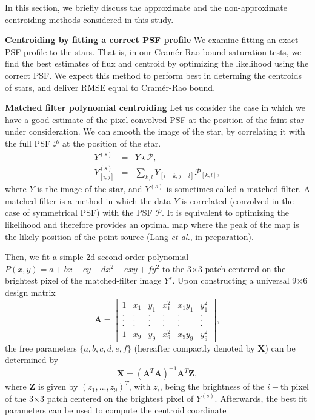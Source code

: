 \documentclass[12pt, preprint]{aastex}
\newcommand{\beq}{\begin{equation}}
\newcommand{\eeq}{\end{equation}}
\begin{document}
In this section, we briefly discuss the approximate and the non-approximate centroiding methods considered in this 
study. 

\begin{description}

\item{{\bf Centroiding by fitting a correct PSF profile}} \quad We examine fitting an exact PSF 
profile to the stars. That is, 
in our Cram\'{e}r-Rao bound saturation tests, we find the best
estimates of flux and centroid by optimizing the likelihood using 
the correct PSF. We expect this method to perform best in determing the centroids
of stars, and deliver RMSE equal to Cram\'{e}r-Rao bound.

\item{{\bf Matched filter polynomial centroiding}} \quad Let us consider the case 
in which we have a good estimate of the pixel-convolved PSF at
the position of the faint star under consideration. 
We can smooth the image of the star, by correlating it with the 
full PSF $\mathcal{P}$ at the position of the star.
\begin{eqnarray}
Y^{(s)} &=& Y \star \mathcal{P}, \\
Y^{(s)}_{[i,j]} &=& \sum_{k,l}Y_{[i-k,j-l]}\mathcal{P}_{[k,l]},
\end{eqnarray}
where $Y$ is the image of the star, and $Y^{(s)}$ is sometimes called a matched filter. 
A matched filter is a method in which the data $Y$ is correlated (convolved in the 
case of symmetrical PSF) with the PSF $\mathcal{P}$. It is equivalent to optimizing the 
likelihood and therefore provides an optimal map 
where the peak of the map is the likely position of the 
point source (Lang \emph{et al.}, in preparation).

Then, we fit a simple 2d second-order polynomial 
$P(x,y)=a+bx+cy+dx^2+exy+fy^2$ 
to the 3$\times$3 patch centered on the brightest pixel of the
matched-filter image $Y^{s}$.
Upon constructing a universal 9$\times$6 design matrix
\begin{equation}
    \mathbf{A} = 
    \begin{bmatrix}
        1 & x_{1} & y_{1} & x_{1}^{2} & x_{1}y_{1} & y_{1}^{2} \\
        . & . & . & . & . & .  \\
        . & . & . & . & . & .  \\
        . & . & . & . & . & .  \\
        1 & x_{9} & y_{9} & x_{9}^{2} & x_{9}y_{9} & y_{9}^{2}
    \end{bmatrix},
\end{equation}
the free parameters $\{a,b,c,d,e,f\}$
(hereafter compactly denoted by $\mathbf{X}$) can be determined by 
\beq
\mathbf{X} = (\mathbf{A}^{T}\mathbf{A})^{-1}\mathbf{A}^{T}\mathbf{Z},
\label{linearfit}
\eeq
where $\mathbf{Z}$ is given by $(z_{1},...,z_{9})^{T}$,
with $z_{i}$, being the brightness of the $i-$th pixel of the 3$\times$3 patch centered on the brightest pixel of $Y^{(s)}$.
Afterwards, the best fit parameters can be used to compute the centroid coordinate


\end{description}
\end{document}
